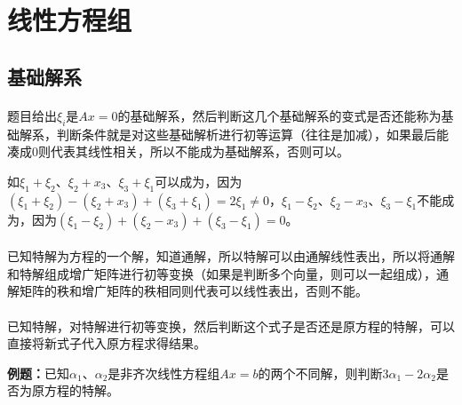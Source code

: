 
\section{线性方程组}
\subsection{基础解系}

\paragraph{}

\paragraph{}

题目给出$\xi_i$是$Ax=0$的基础解系，然后判断这几个基础解系的变式是否还能称为基础解系，判断条件就是对这些基础解析进行初等运算（往往是加减），如果最后能凑成0则代表其线性相关，所以不能成为基础解系，否则可以。

如$\xi_1+\xi_2$、$\xi_2+x_3$、$\xi_3+\xi_1$可以成为，因为$(\xi_1+\xi_2)-(\xi_2+x_3)+(\xi_3+\xi_1)=2\xi_1\neq0$，$\xi_1-\xi_2$、$\xi_2-x_3$、$\xi_3-\xi_1$不能成为，因为$(\xi_1-\xi_2)+(\xi_2-x_3)+(\xi_3-\xi_1)=0$。

\paragraph{}

\paragraph{}

已知特解为方程的一个解，知道通解，所以特解可以由通解线性表出，所以将通解和特解组成增广矩阵进行初等变换（如果是判断多个向量，则可以一起组成），通解矩阵的秩和增广矩阵的秩相同则代表可以线性表出，否则不能。

\paragraph{}

已知特解，对特解进行初等变换，然后判断这个式子是否还是原方程的特解，可以直接将新式子代入原方程求得结果。

\textbf{例题：}已知$\alpha_1$、$\alpha_2$是非齐次线性方程组$Ax=b$的两个不同解，则判断$3\alpha_1-2\alpha_2$是否为原方程的特解。

